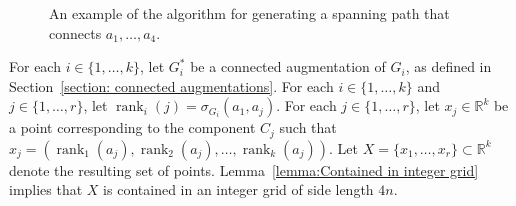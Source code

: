 \documentclass{patmorin}
\DeclareMathOperator{\rank}{rank}
\newcommand{\R}{\mathbb{R}}
\begin{document}
\begin{figure}
   \caption{\small An example of the algorithm for generating a spanning path that connects $a_1,\ldots,a_4$.}
   \label{figure:big-example}
\end{figure}

For each $i\in \{1,\dots,k\}$, let $G_i^*$ be a connected augmentation of $G_i$, as defined in Section~\ref{section: connected augmentations}. For each $i\in\{1,\ldots,k\}$ and $j\in\{1,\ldots,r\}$, let $\rank_i(j) = \sigma_{G_i}(a_1, a_j)$. For each $j\in\{1,\ldots,r\}$, let $x_j\in \mathbb{R}^k$ be a point corresponding to the component $C_j$ such that $x_j = (\rank_1(a_j), \rank_2(a_j), \ldots, \rank_k(a_j))$. Let $X = \{x_1, \ldots, x_r\}\subset\R^k$ denote the resulting set of points. Lemma~\ref{lemma:Contained in integer grid} implies that $X$ is contained in an integer grid of side length $4n$.
\end{document}
